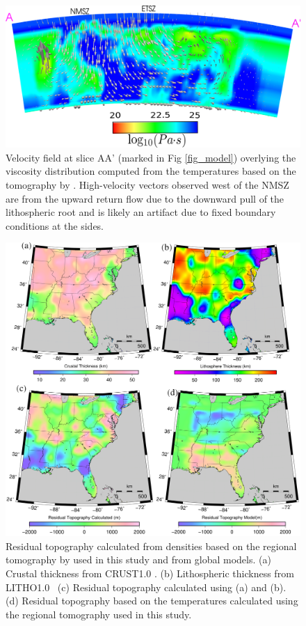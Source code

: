 \documentclass[draft,linenumbers]{agujournal2018}
\begin{document}
\begin{figure}[ht]
    \centering
    \includegraphics[width=0.9\linewidth]{figures/velocity_pattern.png}
    \caption{Velocity field at slice AA' (marked in Fig \ref{fig_model}) overlying the viscosity distribution computed from the temperatures based on the tomography by \citet{Biryol_2016}. High-velocity vectors observed west of the NMSZ are from the upward return flow due to the downward pull of the lithospheric root and is likely an artifact due to fixed boundary conditions at the sides.}
    \label{velocity_pattern}
\end{figure}    
    
%   

\begin{figure}[h!]
    \centering
    \includegraphics[width=\linewidth]{figures/topography.png}
    \caption{Residual topography calculated from densities based on the regional tomography by \citet{Biryol_2016} used in this study and from global models. (a) Crustal thickness from CRUST1.0 \citep{laske2013update}. (b) Lithospheric thickness from LITHO1.0~\citep{pasyanos2014litho1} (c) Residual topography calculated using (a) and (b). (d) Residual topography based on the temperatures calculated using the regional tomography used in this study. }
    \label{topo_res}
\end{figure}
\end{document}
